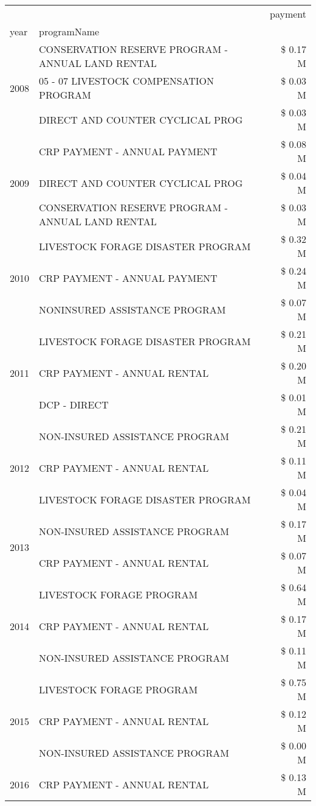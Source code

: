 \begin{tabular}{llr}
\toprule
 &  & payment \\
year & programName &  \\
\midrule
\multirow[t]{3}{*}{2008} & CONSERVATION RESERVE PROGRAM - ANNUAL LAND RENTAL & \$ 0.17 M \\
 & 05 - 07 LIVESTOCK COMPENSATION PROGRAM & \$ 0.03 M \\
 & DIRECT AND COUNTER CYCLICAL PROG & \$ 0.03 M \\
\cline{1-3}
\multirow[t]{3}{*}{2009} & CRP PAYMENT - ANNUAL PAYMENT & \$ 0.08 M \\
 & DIRECT AND COUNTER CYCLICAL PROG & \$ 0.04 M \\
 & CONSERVATION RESERVE PROGRAM - ANNUAL LAND RENTAL & \$ 0.03 M \\
\cline{1-3}
\multirow[t]{3}{*}{2010} & LIVESTOCK FORAGE DISASTER  PROGRAM & \$ 0.32 M \\
 & CRP PAYMENT - ANNUAL PAYMENT & \$ 0.24 M \\
 & NONINSURED ASSISTANCE PROGRAM & \$ 0.07 M \\
\cline{1-3}
\multirow[t]{3}{*}{2011} & LIVESTOCK FORAGE DISASTER PROGRAM & \$ 0.21 M \\
 & CRP PAYMENT - ANNUAL RENTAL & \$ 0.20 M \\
 & DCP - DIRECT & \$ 0.01 M \\
\cline{1-3}
\multirow[t]{3}{*}{2012} & NON-INSURED ASSISTANCE PROGRAM & \$ 0.21 M \\
 & CRP PAYMENT - ANNUAL RENTAL & \$ 0.11 M \\
 & LIVESTOCK FORAGE DISASTER PROGRAM & \$ 0.04 M \\
\cline{1-3}
\multirow[t]{2}{*}{2013} & NON-INSURED ASSISTANCE PROGRAM & \$ 0.17 M \\
 & CRP PAYMENT - ANNUAL RENTAL & \$ 0.07 M \\
\cline{1-3}
\multirow[t]{3}{*}{2014} & LIVESTOCK FORAGE PROGRAM & \$ 0.64 M \\
 & CRP PAYMENT - ANNUAL RENTAL & \$ 0.17 M \\
 & NON-INSURED ASSISTANCE PROGRAM & \$ 0.11 M \\
\cline{1-3}
\multirow[t]{3}{*}{2015} & LIVESTOCK FORAGE PROGRAM & \$ 0.75 M \\
 & CRP PAYMENT - ANNUAL RENTAL & \$ 0.12 M \\
 & NON-INSURED ASSISTANCE PROGRAM & \$ 0.00 M \\
\cline{1-3}
\multirow[t]{2}{*}{2016} & CRP PAYMENT - ANNUAL RENTAL & \$ 0.13 M \\

\end{tabular}
